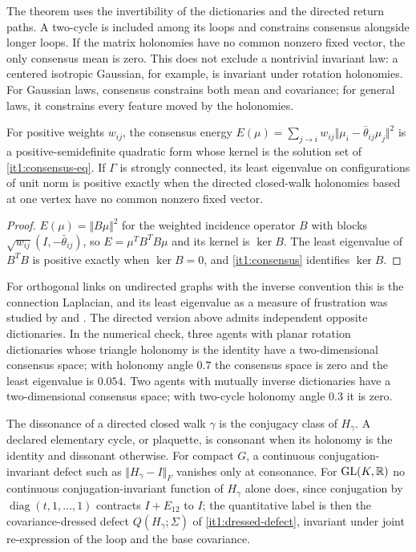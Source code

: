 \documentclass[11pt,letterpaper]{report}
\begin{document}
The theorem uses the invertibility of the dictionaries and the directed return paths. A two-cycle is included among its loops and constrains consensus alongside longer loops. If the matrix holonomies have no common nonzero fixed vector, the only consensus mean is zero. This does not exclude a nontrivial invariant law: a centered isotropic Gaussian, for example, is invariant under rotation holonomies. For Gaussian laws, consensus constrains both mean and covariance; for general laws, it constrains every feature moved by the holonomies.

For positive weights $w_{ij}$, the consensus energy $E(\mu)=\sum_{j\to i}w_{ij}\Vert\mu_i-\bar\theta_{ij}\mu_j\Vert^2$ is a positive-semidefinite quadratic form whose kernel is the solution set of \cref{it1:consensus-eq}. If $\Gamma$ is strongly connected, its least eigenvalue on configurations of unit norm is positive exactly when the directed closed-walk holonomies based at one vertex have no common nonzero fixed vector.
\begin{proof}
$E(\mu)=\Vert B\mu\Vert^2$ for the weighted incidence operator $B$ with blocks $\sqrt{w_{ij}}(I,-\bar\theta_{ij})$, so $E=\mu^TB^TB\mu$ and its kernel is $\ker B$. The least eigenvalue of $B^TB$ is positive exactly when $\ker B=0$, and \cref{it1:consensus} identifies $\ker B$.
\end{proof}

For orthogonal links on undirected graphs with the inverse convention this is the connection Laplacian, and its least eigenvalue as a measure of frustration was studied by \citet{SingerWu2012} and \citet{BandeiraSingerSpielman2013}. The directed version above admits independent opposite dictionaries. In the numerical check, three agents with planar rotation dictionaries whose triangle holonomy is the identity have a two-dimensional consensus space; with holonomy angle $0.7$ the consensus space is zero and the least eigenvalue is $0.054$. Two agents with mutually inverse dictionaries have a two-dimensional consensus space; with two-cycle holonomy angle $0.3$ it is zero.

The dissonance of a directed closed walk $\gamma$ is the conjugacy class of $H_\gamma$. A declared elementary cycle, or plaquette, is consonant when its holonomy is the identity and dissonant otherwise. For compact $G$, a continuous conjugation-invariant defect such as $\Vert H_\gamma-I\Vert_F$ vanishes only at consonance. For $\mathrm{GL}(K,\mathbb R)$ no continuous conjugation-invariant function of $H_\gamma$ alone does, since conjugation by $\operatorname{diag}(t,1,\ldots,1)$ contracts $I+E_{12}$ to $I$; the quantitative label is then the covariance-dressed defect $Q(H_\gamma;\Sigma)$ of \cref{it1:dressed-defect}, invariant under joint re-expression of the loop and the base covariance.
\end{document}
